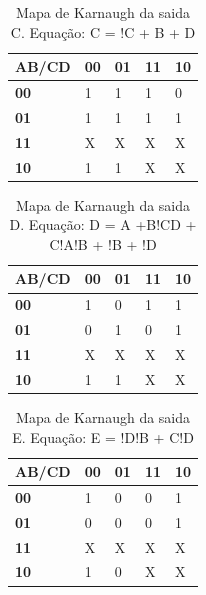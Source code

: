 \documentclass[12pts]{article}
\begin{document}
\singlespacing

\begin{table}[h]
\begin{center}
	\begin{tabular}{|l|l|l|l|l|}
		\hline
		\textbf{AB/CD} & \textbf{00} & \textbf{01} & \textbf{11} & \textbf{10}\\
		\hline
		\textbf{00} & 1 & 1 & 1 & 0\\
		\hline
		\textbf{01} & 1 & 1 & 1 & 1\\
		\hline
		\textbf{11} & X & X & X & X\\
		\hline
		\textbf{10} & 1 & 1 & X & X\\
		\hline
	\end{tabular}
\end{center}
	\caption{Mapa de Karnaugh da saida C. Equação: C = !C + B + D }
	\end{table}
	\singlespacing
	
\begin{table}[h]
\begin{center}
	\begin{tabular}{|l|l|l|l|l|}
		\hline
		\textbf{AB/CD} & \textbf{00} & \textbf{01} & \textbf{11} & \textbf{10}\\
		\hline
		\textbf{00} & 1 & 0 & 1 & 1\\
		\hline
		\textbf{01} & 0 & 1 & 0 & 1\\
		\hline
		\textbf{11} & X & X & X & X\\
		\hline
		\textbf{10} & 1 & 1 & X & X\\
		\hline
	\end{tabular}
\end{center}
	\caption{Mapa de Karnaugh da saida D. Equação: D = A +B!CD + C!A!B + !B + !D }
	\end{table}
	\singlespacing
	
\begin{table}[h]
\begin{center}
	\begin{tabular}{|l|l|l|l|l|}
		\hline
		\textbf{AB/CD} & \textbf{00} & \textbf{01} & \textbf{11} & \textbf{10}\\
		\hline
		\textbf{00} & 1 & 0 & 0 & 1\\
		\hline
		\textbf{01} & 0 & 0 & 0 & 1\\
		\hline
		\textbf{11} & X & X & X & X\\
		\hline
		\textbf{10} & 1 & 0 & X & X\\
		\hline
	\end{tabular}
\end{center}
	\caption{Mapa de Karnaugh da saida E. Equação: E = !D!B + C!D }
	\end{table}
	\singlespacing
\end{document}
